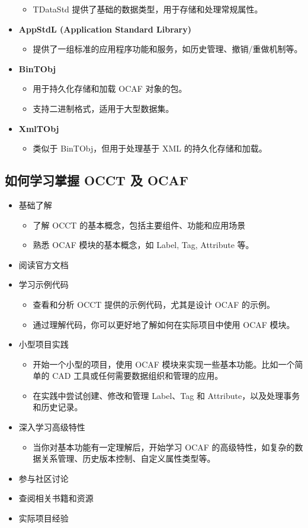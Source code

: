 \documentclass[11pt]{article}
\begin{document}
\begin{itemize}
\begin{itemize}
\item TDataStd 提供了基础的数据类型，用于存储和处理常规属性。
\end{itemize}
\item \textbf{AppStdL (Application Standard Library)}
\begin{itemize}
\item 提供了一组标准的应用程序功能和服务，如历史管理、撤销/重做机制等。
\end{itemize}
\item \textbf{BinTObj}
\begin{itemize}
\item 用于持久化存储和加载 OCAF 对象的包。
\item 支持二进制格式，适用于大型数据集。
\end{itemize}
\item \textbf{XmlTObj}
\begin{itemize}
\item 类似于 BinTObj，但用于处理基于 XML 的持久化存储和加载。
\end{itemize}
\end{itemize}
\subsection{如何学习掌握 OCCT 及 OCAF}
\label{sec:orga1f79b2}

\begin{itemize}
\item 基础了解
\begin{itemize}
\item 了解 OCCT 的基本概念，包括主要组件、功能和应用场景
\item 熟悉 OCAF 模块的基本概念，如 Label, Tag, Attribute 等。
\end{itemize}
\item 阅读官方文档
\item 学习示例代码
\begin{itemize}
\item 查看和分析 OCCT 提供的示例代码，尤其是设计 OCAF 的示例。
\item 通过理解代码，你可以更好地了解如何在实际项目中使用 OCAF 模块。
\end{itemize}
\item 小型项目实践
\begin{itemize}
\item 开始一个小型的项目，使用 OCAF 模块来实现一些基本功能。比如一个简单的 CAD 工具或任何需要数据组织和管理的应用。
\item 在实践中尝试创建、修改和管理 Label、Tag 和 Attribute，以及处理事务和历史记录。
\end{itemize}
\item 深入学习高级特性
\begin{itemize}
\item 当你对基本功能有一定理解后，开始学习 OCAF 的高级特性，如复杂的数据关系管理、历史版本控制、自定义属性类型等。
\end{itemize}
\item 参与社区讨论
\item 查阅相关书籍和资源
\item 实际项目经验
\end{itemize}
\end{document}
